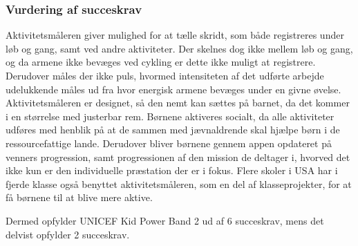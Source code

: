 \subsubsection{Vurdering af succeskrav}
Aktivitetsmåleren giver mulighed for at tælle skridt, som både registreres under løb og gang, samt ved andre aktiviteter. Der skelnes dog ikke mellem løb og gang, og da armene ikke bevæges ved cykling er dette ikke muligt at registrere. Derudover måles der ikke puls, hvormed intensiteten af det udførte arbejde udelukkende måles ud fra hvor energisk armene bevæges under en givne øvelse. Aktivitetsmåleren er designet, så den nemt kan sættes på barnet, da det kommer i en størrelse med justerbar rem. \citep{PowerManual2015} \newline
Børnene aktiveres socialt, da alle aktiviteter udføres med henblik på at de sammen med jævnaldrende skal hjælpe børn i de ressourcefattige lande. Derudover bliver børnene gennem appen opdateret på venners progression, samt progressionen af den mission de deltager i, hvorved det ikke kun er den individuelle præstation der er i fokus. Flere skoler i USA har i fjerde klasse også benyttet aktivitetsmåleren, som en del af klasseprojekter, for at få børnene til at blive mere aktive. \citep{PowerAbout2015}

Dermed opfylder UNICEF Kid Power Band 2 ud af 6 succeskrav, mens det delvist opfylder 2 succeskrav.

